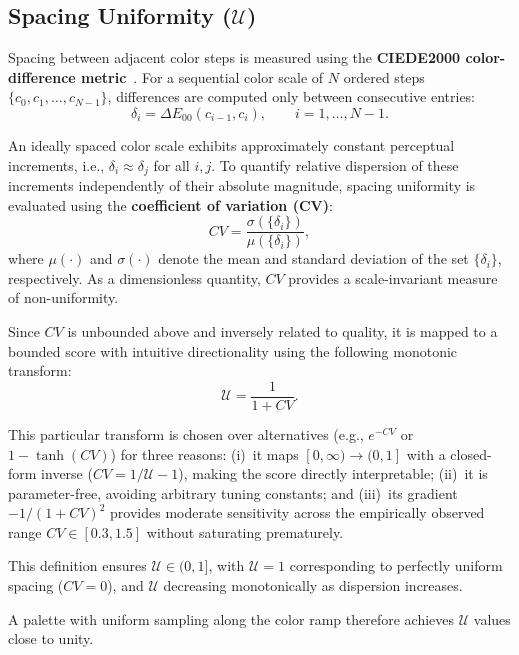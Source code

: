 \subsection{Spacing Uniformity ($\mathcal{U}$)}

Spacing between adjacent color steps is measured using the
\textbf{CIEDE2000 color-difference metric}~\cite{luo2001}.
For a sequential color scale of $N$ ordered steps
$\{c_0, c_1, \dots, c_{N-1}\}$, differences are computed only between
consecutive entries:
\begin{equation}
\delta_i = \Delta E_{00}(c_{i-1}, c_i),
\qquad i = 1, \dots, N-1.
\end{equation}

An ideally spaced color scale exhibits approximately constant perceptual
increments, i.e., $\delta_i \approx \delta_j$ for all $i,j$.
To quantify relative dispersion of these increments independently of their
absolute magnitude, spacing uniformity is evaluated using the
\textbf{coefficient of variation (CV)}:
\begin{equation}
CV = \frac{\sigma(\{\delta_i\})}{\mu(\{\delta_i\})},
\end{equation}
where $\mu(\cdot)$ and $\sigma(\cdot)$ denote the mean and standard deviation
of the set $\{\delta_i\}$, respectively. As a dimensionless quantity,
$CV$ provides a scale-invariant measure of non-uniformity.

Since $CV$ is unbounded above and inversely related to quality, it is mapped
to a bounded score with intuitive directionality using the following
monotonic transform:
\begin{equation}
\mathcal{U} = \frac{1}{1 + CV}.
\end{equation}

This particular transform is chosen over alternatives (e.g., $e^{-CV}$
or $1 - \tanh(CV)$) for three reasons:
(i)~it maps $[0,\infty) \to (0,1]$ with a closed-form inverse
($CV = 1/\mathcal{U} - 1$), making the score directly interpretable;
(ii)~it is parameter-free, avoiding arbitrary tuning constants; and
(iii)~its gradient $-1/(1+CV)^2$ provides moderate sensitivity across
the empirically observed range $CV \in [0.3, 1.5]$ without saturating
prematurely.

This definition ensures $\mathcal{U} \in (0,1]$, with
$\mathcal{U} = 1$ corresponding to perfectly uniform spacing ($CV = 0$),
and $\mathcal{U}$ decreasing monotonically as dispersion increases.

A palette with uniform sampling along the color ramp therefore achieves
$\mathcal{U}$ values close to unity.
